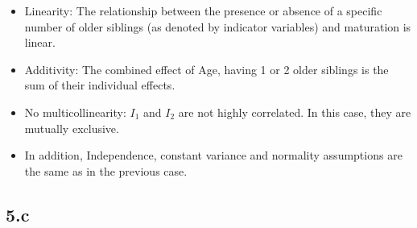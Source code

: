 \documentclass[12pt]{article}
\begin{document}
\begin{itemize}
    \item Linearity:  The relationship between the presence or absence of a specific
    number of older siblings (as denoted by indicator variables) and maturation is linear.
    \item Additivity: The combined effect of Age, having 1 or 2 older siblings
    is the sum of their individual effects.
    \item No multicollinearity: \(I_1\) and \(I_2\) are not highly correlated.
    In this case, they are mutually exclusive.
    \item In addition, Independence, constant variance and normality assumptions
    are the same as in the previous case.
\end{itemize}

\newpage
\subsection*{5.c}
\end{document}
